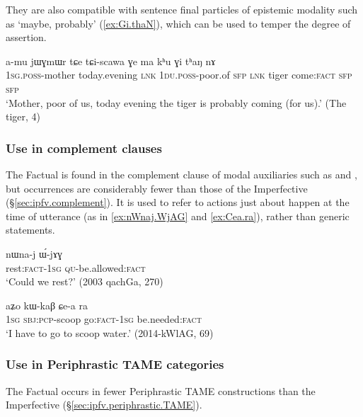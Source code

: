 They are also compatible with sentence final particles of epistemic modality such as  `maybe, probably' (\ref{ex:Gi.thaN}), which can be used to temper the degree of assertion.

\begin{exe}
\ex \label{ex:Gi.thaN}
\gll a-mu jɯɣmɯr tɕe tɕi-scawa ɣe ma kʰu ɣi tʰaŋ nɤ \\
 \textsc{1sg}.\textsc{poss}-mother today.evening \textsc{lnk}  \textsc{1du}.\textsc{poss}-poor.of \textsc{sfp} \textsc{lnk} tiger  come:\textsc{fact} \textsc{sfp} \textsc{sfp} \\
\glt `Mother, poor of us, today evening the tiger is probably coming (for us).' (The tiger, 4)
 \end{exe}

\subsubsection{Use in complement clauses} \label{sec:fact.complement}
The Factual is found in the complement clause of modal auxiliaries such as  and , but occurrences are considerably fewer than those of the Imperfective (§\ref{sec:ipfv.complement}). It is used to refer to actions just about happen at the time of utterance (as in \ref{ex:nWnaj.WjAG} and \ref{ex:Cea.ra}), rather than generic statements.


\begin{exe}
\ex \label{ex:nWnaj.WjAG}
\gll nɯna-j ɯ́-jɤɣ \\
rest:\textsc{fact}-\textsc{1sg} \textsc{qu}-be.allowed:\textsc{fact} \\
\glt `Could we rest?' (2003 qachGa, 270)
\end{exe}

\begin{exe}
\ex \label{ex:Cea.ra}
\gll aʑo kɯ-kaβ ɕe-a ra \\
\textsc{1sg} \textsc{sbj}:\textsc{pcp}-scoop go:\textsc{fact}-\textsc{1sg} be.needed:\textsc{fact} \\
\glt `I have to go to scoop water.' (2014-kWlAG, 69)
\end{exe} 

\subsubsection{Use in Periphrastic TAME categories} \label{sec:fact.periphrastic}
The Factual occurs in fewer Periphrastic TAME constructions than the Imperfective (§\ref{sec:ipfv.periphrastic.TAME}).


